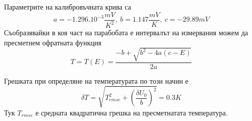 \documentclass[aps, prb, twocolumn, a4paper, floatfix, reprint]{revtex4-2}
\begin{document}
Параметрите на калибровъчната крива са 
\begin{equation*}
    a = -1.296.10^{-3} \frac{mV}{K^2}, \ b = 1.147 \frac{mV}{K}, \ c = -29.89 mV
\end{equation*}
Съобразявайки в коя част на парабобата е интервалът на измервания можем да пресметнем офратната функция 
\begin{equation*}
    T = T(E) = \frac{-b+\sqrt{b^2 - 4a(c-E)}}{2a}
\end{equation*}

Грешката при определяне на температурата по този начин е 
\begin{equation*}
    \delta T = \sqrt{T_{rmse}^2 + (\frac{\delta U_0}{b})^2} = 0.3K
\end{equation*}
Тук $T_{rmse}$ е средната квадратична грешка на пресметнатата температура. 
\end{document}
